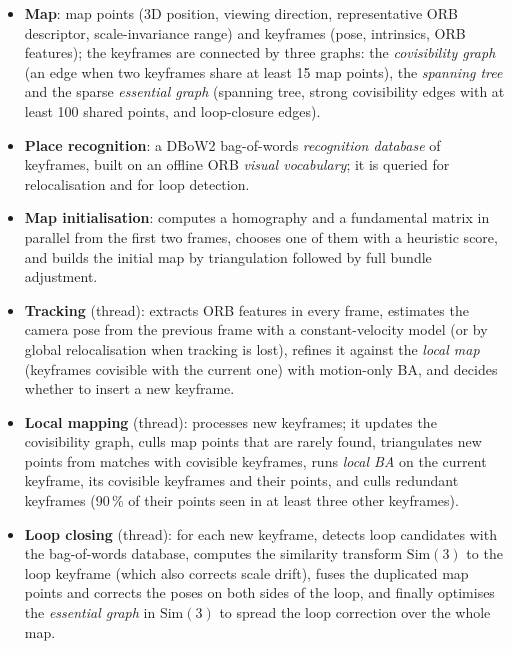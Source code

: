 \begin{itemize}
\item \textbf{Map}: map points (3D position, viewing direction, representative ORB
  descriptor, scale-invariance range) and keyframes (pose, intrinsics, ORB features); the
  keyframes are connected by three graphs: the \emph{covisibility graph} (an edge when two
  keyframes share at least 15 map points), the \emph{spanning tree} and the sparse
  \emph{essential graph} (spanning tree, strong covisibility edges with at least 100
  shared points, and loop-closure edges).
\item \textbf{Place recognition}: a DBoW2 bag-of-words \emph{recognition database} of
  keyframes, built on an offline ORB \emph{visual vocabulary}; it is queried for
  relocalisation and for loop detection.
\item \textbf{Map initialisation}: computes a homography and a fundamental matrix in parallel
  from the first two frames, chooses one of them with a heuristic score, and builds the
  initial map by triangulation followed by full bundle adjustment.
\item \textbf{Tracking} (thread): extracts ORB features in every frame, estimates the
  camera pose from the previous frame with a constant-velocity model (or by global
  relocalisation when tracking is lost), refines it against the \emph{local map} (keyframes
  covisible with the current one) with motion-only BA, and decides whether to insert a new
  keyframe.
\item \textbf{Local mapping} (thread): processes new keyframes; it updates the covisibility
  graph, culls map points that are rarely found, triangulates new points from matches with
  covisible keyframes, runs \emph{local BA} on the current keyframe, its covisible keyframes
  and their points, and culls redundant keyframes (90\,\% of their points seen in at least
  three other keyframes).
\item \textbf{Loop closing} (thread): for each new keyframe, detects loop candidates with
  the bag-of-words database, computes the similarity transform $\mathrm{Sim}(3)$ to the loop
  keyframe (which also corrects scale drift), fuses the duplicated map points and
  corrects the poses on both sides of the loop, and finally optimises the \emph{essential
  graph} in $\mathrm{Sim}(3)$ to spread the loop correction over the whole map.
\end{itemize}

